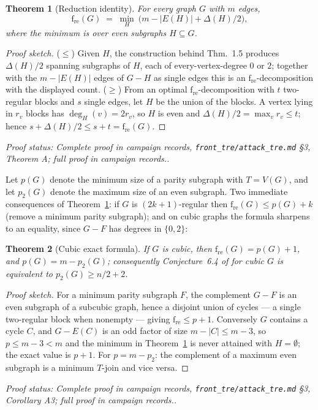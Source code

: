 \documentclass[a4paper,11pt]{amsart}
\newtheorem{theorem}{Theorem}[section]
\theoremstyle{definition}
\theoremstyle{remark}
\newcommand{\fre}{\operatorname{f_{re}}}
\newcommand{\proofsrc}[1]{\par\smallskip\noindent\begin{sloppypar}\small\emph{Proof status: #1.}\end{sloppypar}\par\smallskip}
\begin{document}
\begin{theorem}[Reduction identity]\label{thm:frered}
For every graph $G$ with $m$ edges,
\[
\fre(G)\;=\;\min_{H}\ \bigl(m-|E(H)|+\Delta(H)/2\bigr),
\]
where the minimum is over even subgraphs $H\subseteq G$.
\end{theorem}
\begin{proof}[Proof sketch]
($\le$) Given $H$, the construction behind \cite{AABC25} Thm.~1.5 produces $\Delta(H)/2$ spanning
subgraphs of $H$, each of every-vertex-degree $0$ or $2$; together with the $m-|E(H)|$ edges of $G-H$ as
single edges this is an $\fre$-decomposition with the displayed count. ($\ge$) From an optimal
$\fre$-decomposition with $t$ two-regular blocks and $s$ single edges, let $H$ be the union of the blocks.
A vertex lying in $r_v$ blocks has $\deg_H(v)=2r_v$, so $H$ is even and $\Delta(H)/2=\max_v r_v\le t$;
hence $s+\Delta(H)/2\le s+t=\fre(G)$.
\end{proof}
\proofsrc{Complete proof in campaign records, \texttt{front\_tre/attack\_tre.md} \S3, Theorem A; full proof
in campaign records.}

Let $p(G)$ denote the minimum size of a parity subgraph with $T=V(G)$, and let $p_2(G)$ denote the maximum
size of an even subgraph. Two immediate consequences of Theorem~\ref{thm:frered}: if $G$ is $(2k+1)$-regular
then $\fre(G)\le p(G)+k$ (remove a minimum parity subgraph); and on cubic graphs the formula sharpens to an
equality, since $G-F$ has degrees in $\{0,2\}$:

\begin{theorem}[Cubic exact formula]\label{thm:cubicexact}
If $G$ is cubic, then $\fre(G)=p(G)+1$, and $p(G)=m-p_2(G)$; consequently Conjecture~6.4 of
\cite{AABC25} for cubic $G$ is equivalent to $p_2(G)\ge n/2+2$.
\end{theorem}
\begin{proof}[Proof sketch]
For a minimum parity subgraph $F$, the complement $G-F$ is an even subgraph of a subcubic graph, hence a
disjoint union of cycles --- a single two-regular block when nonempty --- giving $\fre\le p+1$. Conversely
$G$ contains a cycle $C$, and $G-E(C)$ is an odd factor of size $m-|C|\le m-3$, so $p\le m-3<m$ and the
minimum in Theorem~\ref{thm:frered} is never attained with $H=\emptyset$; the exact value is $p+1$. For
$p=m-p_2$: the complement of a maximum even subgraph is a minimum $T$-join and vice versa.
\end{proof}
\proofsrc{Complete proof in campaign records, \texttt{front\_tre/attack\_tre.md} \S3, Corollary A3; full
proof in campaign records.}
\end{document}
